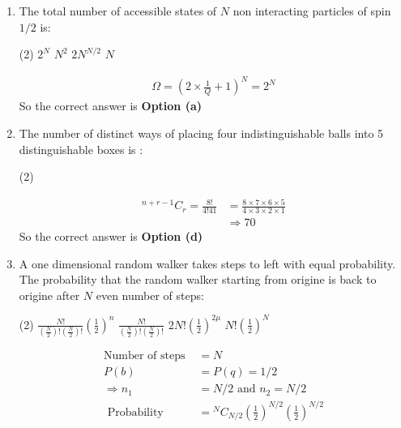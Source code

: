 \begin{enumerate}
	\item The total number of accessible states of $N$ non interacting particles of spin $1/2$ is:
	\begin{tasks}(2)
		\task[\textbf{a.}]$2^{N}$
		\task[\textbf{b.}]$N^{2}$
		\task[\textbf{c.}]$2 N^{N / 2}$
		\task[\textbf{d.}]  $N$
	\end{tasks}
	\begin{answer}
		\begin{align*}
		\Omega=\left(2 \times \frac{1}{Q}+1\right)^{N}=2^{N}
		\end{align*}
		So the correct answer is \textbf{Option (a)}
	\end{answer}
	\item The number of distinct ways of placing four indistinguishable balls into 5 distinguishable boxes is :
	\begin{tasks}(2)
	\end{tasks}
	\begin{answer}
		\begin{align*}
		{ }^{n+r-1} C_{r}=\frac{8 !}{4 ! 41}&=\frac{8 \times 7 \times 6 \times 5}{4 \times 3 \times 2 \times 1}\\
		&\Rightarrow70
		\end{align*}
		So the correct answer is \textbf{Option (d)}
	\end{answer}
	\item A one dimensional random walker takes steps to left with equal probability.  The probability that the random walker starting from origine is back to origine after $N$ even number of steps:
	\begin{tasks}(2)
		\task[\textbf{a.}]$\frac{N !}{\left(\frac{N}{2}\right) !\left(\frac{N}{2}\right) !}\left(\frac{1}{2}\right)^{n}$
		\task[\textbf{b.}]$\frac{N !}{\left(\frac{N}{2}\right) !\left(\frac{N}{2}\right) !}$
		\task[\textbf{c.}] $2N!\left(\frac{1}{2}\right)^{2 \mu}$
		\task[\textbf{d.}] $N !\left(\frac{1}{2}\right)^{N}$
	\end{tasks}
	\begin{answer}
		\begin{align*}
		\text{Number of steps }&=N\\
		P(b)&=P(q)=1/2 \\
		\Rightarrow n_{1}&=N / 2 \text { and } n_{2}=N / 2\\
		\text { Probability  }&={ }^{N} C_{N / 2}\left(\frac{1}{2}\right)^{N / 2}\left(\frac{1}{2}\right)^{N / 2}\\

\end{align*}
\end{answer}
\end{enumerate}
